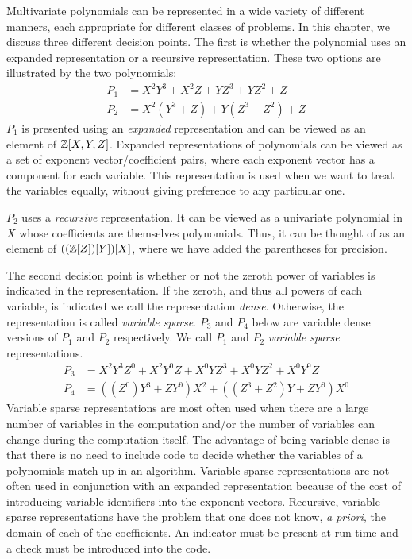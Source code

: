 Multivariate polynomials can be represented in a wide variety of
different manners, each appropriate for different classes of problems.
In this chapter, we discuss three different decision points.  The
first is whether the polynomial uses an expanded representation or a
recursive representation.  These two options are illustrated by the
two polynomials:
\[
\begin{aligned}
P_{1} &= X^{2} Y^{3} + X^{2} Z + YZ^{3} + YZ^{2} +Z \\
P_{2} & = X^{2}(Y^{3} + Z) + Y(Z^{3} + Z^{2}) + Z
\end{aligned}
\]
$P_{1}$ is presented using an {\em expanded} representation and can be
viewed as an element of $\mathbb{Z}[X,Y,Z]$.  Expanded representations of
polynomials can be viewed as a set of exponent vector/coefficient
pairs, where each exponent vector has a component for each variable.
This representation is used when we want to treat the variables
equally, without giving preference to any particular one.
 

$P_{2}$ uses a {\em recursive} representation.  It can be viewed as a
univariate polynomial in $X$ whose coefficients are themselves
polynomials.  Thus, it can be thought of as an element of
$((\mathbb{Z}[Z])[Y])[X]$, where we have added the parentheses for precision.

The second decision point is whether or not the zeroth power of
variables is indicated in the representation.  If the zeroth, and thus
all powers of each variable, is indicated we call the representation
{\em dense\/}.  Otherwise, the representation is called {\em
variable sparse\/}.  $P_{3}$ and $P_{4}$ below are variable dense
versions of $P_{1}$ and $P_{2}$ respectively.  We call $P_{1}$ and
$P_{2}$ {\em variable sparse} representations.
\[
\begin{aligned}
P_{3} &= X^{2} Y^{3}Z^{0} + X^{2} Y^{0} Z + X^{0} Y Z^{3} + X^{0} Y
Z^{2} +X^{0} Y^{0} Z \\
P_{4} & = ((Z^{0}) Y^{3} + Z Y^{0}) X^{2} 
    + ((Z^{3} + Z^{2}) Y + Z Y^{0}) X^{0}
\end{aligned}
\]
Variable sparse representations are most often used when there are a
large number of variables in the computation and/or the number of
variables can change during the computation itself.  The advantage of
being variable dense is that there is no need to include code to
decide whether the variables of a polynomials match up in an
algorithm.  Variable sparse representations are not often used in
conjunction with an expanded representation because of the cost of
introducing variable identifiers into the exponent vectors.
Recursive, variable sparse representations have the problem that one
does not know, {\em a priori\/}, the domain of each of the
coefficients.  An indicator must be present at run time and a check
must be introduced into the code.

